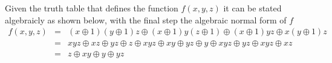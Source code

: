Given the truth table that defines the function $f(x,y,z)$ it can be stated
algebraicly as shown below, with the final step the algebraic normal form
of $f$
\begin{eqnarray*}
    f(x,y,z) &=& (x \oplus 1)(y \oplus 1)z \oplus
                (x \oplus 1)y(z \oplus 1) \oplus
                (x \oplus 1)yz \oplus
                x(y \oplus 1)z \\
    &=& xyz \oplus xz \oplus yz \oplus z \oplus
                xyz \oplus xy \oplus yz \oplus y \oplus
                xyz \oplus yz \oplus
                xyz \oplus xz\\
    &=& z \oplus xy \oplus y \oplus yz
\end{eqnarray*}